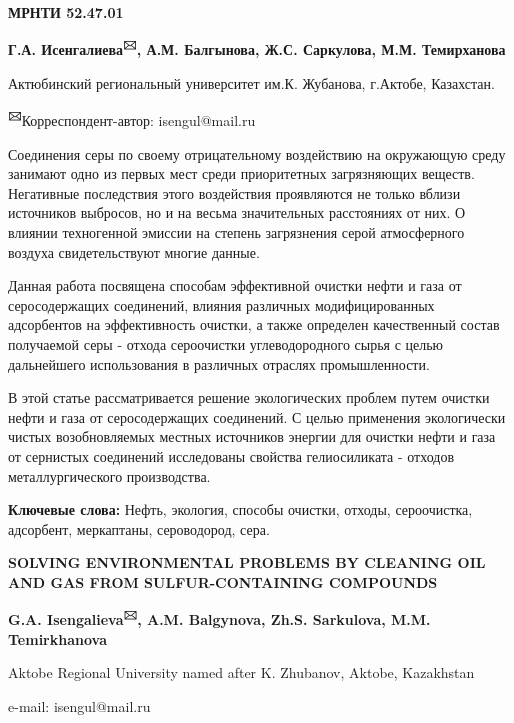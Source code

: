 \newpage
{\bfseries МРНТИ 52.47.01}


\begin{center}
{\bfseries Г.А. Исенгалиева\textsuperscript{🖂}, А.М. Балгынова, Ж.С. Саркулова, М.М. Темирханова}

Актюбинский региональный университет им.К. Жубанова, г.Актобе,
Казахстан.

{\bfseries \textsuperscript{🖂}}Корреспондент-автор: isengul@mail.ru
\end{center}

Соединения серы по своему отрицательному воздействию на окружающую среду
занимают одно из первых мест среди приоритетных загрязняющих веществ.
Негативные последствия этого воздействия проявляются не только вблизи
источников выбросов, но и на весьма значительных расстояниях от них. О
влиянии техногенной эмиссии на степень загрязнения серой атмосферного
воздуха свидетельствуют многие данные.

Данная работа посвящена способам эффективной очистки нефти и газа от
серосодержащих соединений, влияния различных модифицированных
адсорбентов на эффективность очистки, а также определен качественный
состав получаемой серы - отхода сероочистки углеводородного сырья с
целью дальнейшего использования в различных отраслях промышленности.

В этой статье рассматривается решение экологических проблем путем
очистки нефти и газа от серосодержащих соединений. С целью применения
экологически чистых возобновляемых местных источников энергии для
очистки нефти и газа от сернистых соединений исследованы свойства
гелиосиликата - отходов металлургического производства.

{\bfseries Ключевые слова:} Нефть, экология, способы очистки, отходы,
сероочистка, адсорбент, меркаптаны, сероводород, сера.

\begin{center}
{\large\bfseries SOLVING ENVIRONMENTAL PROBLEMS BY CLEANING OIL AND GAS FROM SULFUR-CONTAINING COMPOUNDS}

{\bfseries G.A. Isengalieva\textsuperscript{🖂}, A.M. Balgynova, Zh.S. Sarkulova, M.M. Temirkhanova}

Aktobe Regional University named after K. Zhubanov, Aktobe, Kazakhstan

e-mail: isengul@mail.ru
\end{center}

